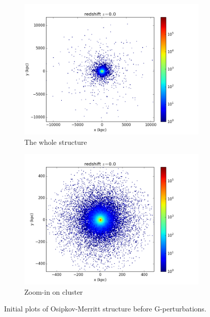 \begin{figure}
\centering
\begin{subfigure}{.5\textwidth}
  \centering
  \includegraphics[width=1.0\linewidth]{img/Read_OMGOO_IC_1.png}
  \caption{The whole structure}
  \label{fig:sub1}
\end{subfigure}%
\begin{subfigure}{.5\textwidth}
  \centering
  \includegraphics[width=1.0\linewidth]{img/Read_OMGOO_IC_2.png}
  \caption{Zoom-in on cluster}
  \label{fig:sub2}
\end{subfigure}
\caption{Initial plots of Osipkov-Merritt structure before G-perturbations.}
\label{fig:test}
\end{figure}

